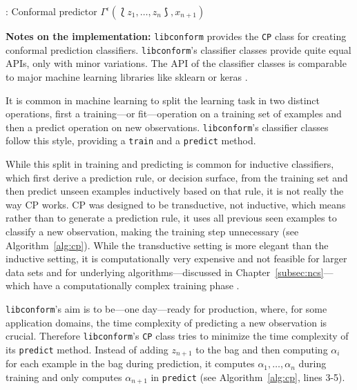 \documentclass[twoside,11pt]{article}
\def\libconform{\texttt{libconform}}
\begin{document}
\begin{algorithm}
  \caption{: Conformal predictor $\Gamma^\epsilon
    (\Lbag z_1,\dots,z_n \Rbag, x_{n+1})$}
  \label{alg:cp}

  \begin{algorithmic}[1]
      \ENDFOR
      \ENDIF
    \ENDFOR
  \end{algorithmic}
\end{algorithm}

\noindent
\textbf{Notes on the implementation:}
\libconform{} provides the \texttt{CP} class for creating
conformal prediction classifiers. \libconform{}'s
classifier classes provide quite equal APIs, only with
minor variations.
The API of the classifier classes is comparable to major
machine learning libraries like sklearn or keras
\citep[see][]{sklearn_api, keras}.

It is common in machine learning to split the learning task
in two distinct operations, first a
training---or fit---operation on a training set of examples
and then a predict operation on new observations.
\libconform{}'s classifier classes follow this style,
providing a \texttt{train} and a \texttt{predict} method.

While this split in training and predicting is common for
inductive classifiers, which first derive a prediction
rule, or decision surface, from the training set and then
predict unseen examples inductively based on that rule,
it is not really the way CP works. CP was designed to be
transductive, not inductive, which means rather than
to generate a prediction rule, it uses all previous seen
examples to classify a new observation, making the training
step unnecessary (see Algorithm~\ref{alg:cp}).
While the transductive setting is more elegant than the
inductive setting, it is computationally very expensive and
not feasible for larger data sets and for underlying
algorithms---discussed in Chapter~\ref{subsec:ncs}---which
have a computationally complex training phase
\citep[see][Chapter 1]{papadopoulos_et_al_2007,alrw}.

\libconform{}'s aim is to be---one day---ready for
production, where, for some application domains, the time
complexity of predicting a new observation is crucial.
Therefore \libconform{}'s \texttt{CP} class tries to
minimize the time complexity of its \texttt{predict}
method. Instead of adding $z_{n+1}$ to the bag and then
computing $\alpha_i$ for each example in the bag during
prediction, it computes $\alpha_1,\dots,\alpha_n$ during
training and only computes $\alpha_{n+1}$ in
\texttt{predict} (see Algorithm~\ref{alg:cp}, lines 3-5).
\end{document}
